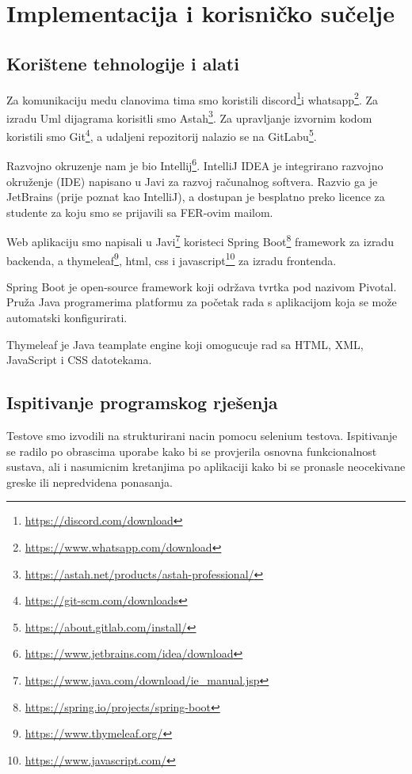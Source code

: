 \chapter{Implementacija i korisničko sučelje}
		
		
		\section{Korištene tehnologije i alati}
		
		Za komunikaciju medu clanovima tima smo koristili discord\footnote{\url{https://discord.com/download}}i whatsapp\footnote{\url{https://www.whatsapp.com/download}}.
		Za izradu Uml dijagrama korisitli smo Astah\footnote{\url{https://astah.net/products/astah-professional/}}.
		Za upravljanje izvornim kodom koristili smo Git\footnote{\url{https://git-scm.com/downloads}}, a udaljeni repozitorij nalazio se na GitLabu\footnote{\url{https://about.gitlab.com/install/}}.
		
		Razvojno okruzenje nam je bio Intellij\footnote{\url{https://www.jetbrains.com/idea/download}}. 
		IntelliJ IDEA je integrirano razvojno okruženje (IDE) napisano u Javi za razvoj računalnog softvera. 
		Razvio ga je JetBrains (prije poznat kao IntelliJ), a dostupan je besplatno preko licence za studente za koju smo se prijavili sa FER-ovim mailom.
		
		Web aplikaciju smo napisali u Javi\footnote{\url{https://www.java.com/download/ie_manual.jsp}} koristeci Spring Boot\footnote{\url{https://spring.io/projects/spring-boot}} framework za izradu backenda, a thymeleaf\footnote{\url{https://www.thymeleaf.org/}}, html, css i javascript\footnote{\url{https://www.javascript.com/}} za izradu frontenda.
		
		Spring Boot je open-source framework koji održava tvrtka pod nazivom Pivotal. Pruža Java programerima platformu za početak rada s aplikacijom koja se može automatski konfigurirati.
		
		Thymeleaf je Java teamplate engine koji omogucuje rad sa HTML, XML, JavaScript i CSS datotekama.
			\eject 
		
	
		\section{Ispitivanje programskog rješenja}
			
			
			 Testove smo izvodili na strukturirani nacin pomocu selenium testova.
			  Ispitivanje se radilo po obrascima uporabe kako bi se provjerila osnovna funkcionalnost sustava, ali i nasumicnim kretanjima po 
			  aplikaciji kako bi se pronasle neocekivane greske  ili nepredvidena ponasanja.
			  
